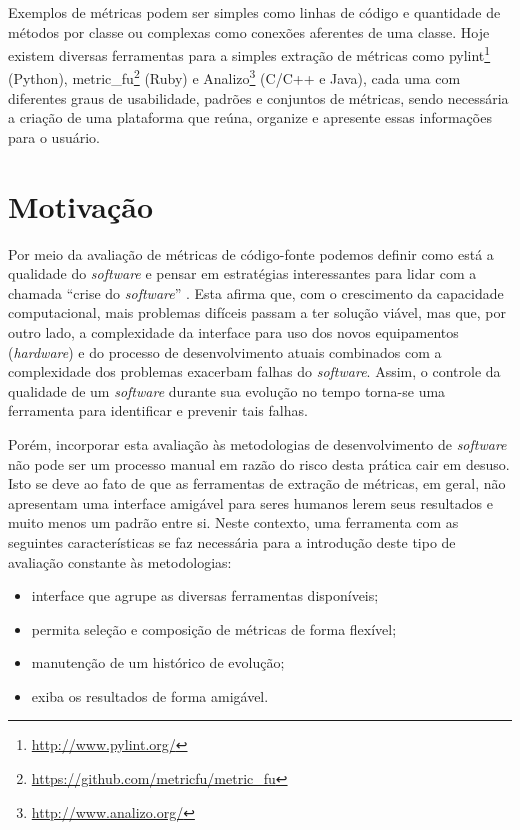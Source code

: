 \documentclass{llncs}
\begin{document}
Exemplos de métricas podem ser simples como linhas de código e quantidade de métodos por classe ou complexas como conexões aferentes de uma classe.
Hoje existem diversas ferramentas para a simples extração de métricas como  pylint\footnote{\url{http://www.pylint.org/}} (Python), metric\_fu\footnote{\url{https://github.com/metricfu/metric_fu}} (Ruby) e Analizo\footnote{\url{http://www.analizo.org/}} (C/C++ e Java), cada uma com diferentes graus de usabilidade, padrões e conjuntos de métricas, sendo necessária a criação de uma plataforma que reúna, organize e apresente essas informações para o usuário.

\section{Motivação}\label{sec:motivacao}
Por meio da avaliação de métricas de código-fonte podemos definir como está a qualidade do \textit{software} e pensar em estratégias interessantes para lidar com a chamada ``crise do \textit{software}'' \cite{nr68}. Esta afirma que, com o crescimento da capacidade computacional, mais problemas difíceis passam a ter solução viável, mas que, por outro lado, a complexidade da interface para uso dos novos equipamentos (\textit{hardware}) e do processo de desenvolvimento atuais combinados com a complexidade dos problemas exacerbam falhas do \textit{software}. Assim, o controle da qualidade de um \textit{software} durante sua evolução no tempo torna-se uma ferramenta para identificar e prevenir tais falhas.

Porém, incorporar esta avaliação às metodologias de desenvolvimento de \textit{software} não pode ser um processo manual em razão do risco desta prática cair em desuso. Isto se deve ao fato de que as ferramentas de extração de métricas, em geral, não apresentam uma interface amigável para seres humanos lerem seus resultados e muito menos um padrão entre si.
Neste contexto, uma ferramenta com as seguintes características se faz necessária para a introdução deste tipo de avaliação constante às metodologias:
\begin{itemize}
  \item interface que agrupe as diversas ferramentas disponíveis;
  \item permita seleção e composição de métricas de forma flexível;
  \item manutenção de um histórico de evolução;
  \item exiba os resultados de forma amigável.
\end{itemize}
\end{document}
